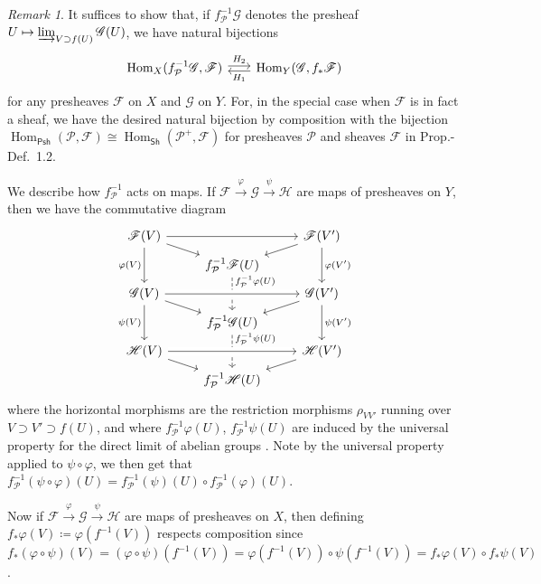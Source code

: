 \documentclass[10pt]{article}
\theoremstyle{definition}
\theoremstyle{remark}
\newtheorem*{remark}{Remark}
\numberwithin{equation}{section}
\numberwithin{figure}{subsubsection}
\DeclareMathOperator{\Hom}{Hom}
\begin{document}
\begin{remark}
  It suffices to show that, if $f^{-1}_\mathcal{P}\mathscr{G}$ denotes the presheaf $U \mapsto \varinjlim_{V \supset f(U)} \mathscr{G}(U)$, we have natural bijections
  \begin{equation}\label{adjointeqs}
    \begin{tikzcd}[column sep=scriptsize]
      \Hom_X(f^{-1}_\mathcal{P}\mathscr{G},\mathscr{F}) \arrow[yshift=2pt]{r}{H_2} & \arrow[yshift=-2pt]{l}{H_1} \Hom_Y(\mathscr{G},f_*\mathscr{F})
    \end{tikzcd}
  \end{equation}
  for any presheaves $\mathscr{F}$ on $X$ and $\mathscr{G}$ on $Y$. For, in the special case when $\mathscr{F}$ is in fact a sheaf, we have the desired natural bijection by composition with the bijection $\Hom_{\mathsf{Psh}}(\mathcal{P},\mathscr{F}) \cong \Hom_{\mathsf{Sh}}(\mathcal{P}^+,\mathscr{F})$ for presheaves $\mathcal{P}$ and sheaves $\mathscr{F}$ in Prop.-Def.~1.2.
  \par We describe how $f^{-1}_\mathcal{P}$ acts on maps. If $\mathscr{F} \overset{\varphi}{\to} \mathscr{G} \overset{\psi}{\to} \mathscr{H}$ are maps of presheaves on $Y$, then we have the commutative diagram
  \begin{equation*}
    \begin{tikzcd}[row sep=tiny]
      \mathscr{F}(V) \arrow{rr} \arrow{dd}[swap]{\varphi(V)}\arrow{dr} & & \mathscr{F}(V') \arrow{dd}{\varphi(V')}\arrow{dl}\\
      & f_\mathcal{P}^{-1}\mathscr{F}(U)\arrow[dashed]{dd}[yshift=10pt]{f_\mathcal{P}^{-1}\varphi(U)}\\
      \mathscr{G}(V)\arrow{dd}[swap]{\psi(V)}\arrow{dr} \arrow[crossing over]{rr} & & \mathscr{G}(V')\arrow{dd}{\psi(V')}\arrow{dl}\\
      & f_\mathcal{P}^{-1} \mathscr{G}(U) \arrow[dashed]{dd}[yshift=10pt]{f_\mathcal{P}^{-1}\psi(U)}\\
      \mathscr{H}(V)\arrow[crossing over]{rr}\arrow{dr} & & \mathscr{H}(V')\arrow{dl}\\
      & f_\mathcal{P}^{-1} \mathscr{H}(U)
    \end{tikzcd}
  \end{equation*}
  where the horizontal morphisms are the restriction morphisms $\rho_{VV'}$ running over $V \supset V' \supset f(U)$, and where $f_\mathcal{P}^{-1}\varphi(U)$, $f_\mathcal{P}^{-1}\psi(U)$ are induced by the universal property for the direct limit of abelian groups \cite[III, Thm.~10.1]{Lan02}. Note by the universal property applied to $\psi \circ \varphi$, we then get that $f_\mathcal{P}^{-1}(\psi \circ \varphi)(U) = f_\mathcal{P}^{-1}(\psi)(U) \circ f_\mathcal{P}^{-1}(\varphi)(U)$.
  \par Now if $\mathscr{F} \overset{\varphi}{\to} \mathscr{G} \overset{\psi}{\to} \mathscr{H}$ are maps of presheaves on $X$, then defining $f_*\varphi(V) \coloneqq \varphi(f^{-1}(V))$ respects composition since $f_*(\varphi \circ \psi)(V) = (\varphi \circ \psi)(f^{-1}(V)) = \varphi(f^{-1}(V)) \circ \psi(f^{-1}(V)) = f_*\varphi(V) \circ f_*\psi(V)$.
\end{remark}
\end{document}
